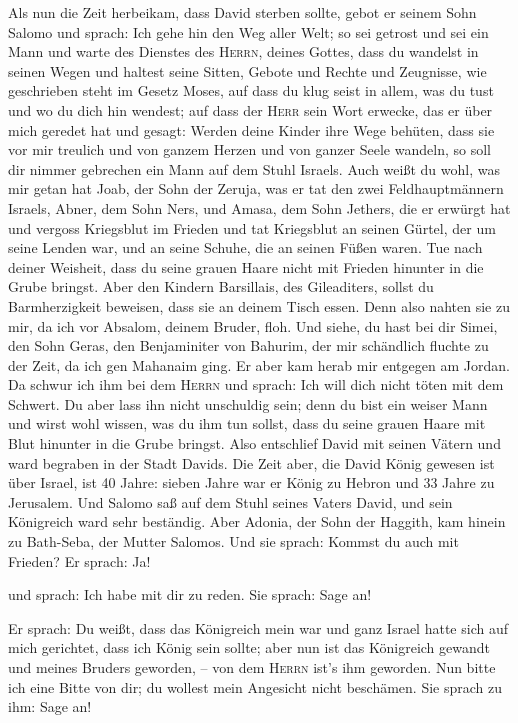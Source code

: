  Als nun die Zeit herbeikam, dass David sterben sollte,
gebot er seinem Sohn Salomo und sprach:  Ich gehe hin den
Weg aller Welt; so sei getrost und sei ein Mann  und warte
des Dienstes des \textsc{Herrn}, deines Gottes, dass du wandelst in
seinen Wegen und haltest seine Sitten, Gebote und Rechte und Zeugnisse,
wie geschrieben steht im Gesetz Moses, auf dass du klug seist in allem,
was du tust und wo du dich hin wendest;  auf dass der
\textsc{Herr} sein Wort erwecke, das er über mich geredet hat und
gesagt: Werden deine Kinder ihre Wege behüten, dass sie vor mir treulich
und von ganzem Herzen und von ganzer Seele wandeln, so soll dir nimmer
gebrechen ein Mann auf dem Stuhl Israels.  Auch weißt du
wohl, was mir getan hat Joab, der Sohn der Zeruja, was er tat den zwei
Feldhauptmännern Israels, Abner, dem Sohn Ners, und Amasa, dem Sohn
Jethers, die er erwürgt hat und vergoss Kriegsblut im Frieden und tat
Kriegsblut an seinen Gürtel, der um seine Lenden war, und an seine
Schuhe, die an seinen Füßen waren.  Tue nach deiner
Weisheit, dass du seine grauen Haare nicht mit Frieden hinunter in die
Grube bringst.  Aber den Kindern Barsillais, des
Gileaditers, sollst du Barmherzigkeit beweisen, dass sie an deinem Tisch
essen. Denn also nahten sie zu mir, da ich vor Absalom, deinem Bruder,
floh.  Und siehe, du hast bei dir Simei, den Sohn Geras,
den Benjaminiter von Bahurim, der mir schändlich fluchte zu der Zeit, da
ich gen Mahanaim ging. Er aber kam herab mir entgegen am Jordan. Da
schwur ich ihm bei dem \textsc{Herrn} und sprach: Ich will dich nicht
töten mit dem Schwert.  Du aber lass ihn nicht unschuldig
sein; denn du bist ein weiser Mann und wirst wohl wissen, was du ihm tun
sollst, dass du seine grauen Haare mit Blut hinunter in die Grube
bringst.  Also entschlief David mit seinen Vätern und
ward begraben in der Stadt Davids.  Die Zeit aber, die
David König gewesen ist über Israel, ist 40 Jahre: sieben Jahre war er
König zu Hebron und 33 Jahre zu Jerusalem.  Und Salomo
saß auf dem Stuhl seines Vaters David, und sein Königreich ward sehr
beständig.  Aber Adonia, der Sohn der Haggith, kam hinein
zu Bath-Seba, der Mutter Salomos. Und sie sprach: Kommst du auch mit
Frieden? Er sprach: Ja!

 und sprach: Ich habe mit dir zu reden. Sie sprach: Sage
an!

 Er sprach: Du weißt, dass das Königreich mein war und
ganz Israel hatte sich auf mich gerichtet, dass ich König sein sollte;
aber nun ist das Königreich gewandt und meines Bruders geworden, -- von
dem \textsc{Herrn} ist's ihm geworden.  Nun bitte ich
eine Bitte von dir; du wollest mein Angesicht nicht beschämen. Sie
sprach zu ihm: Sage an!

